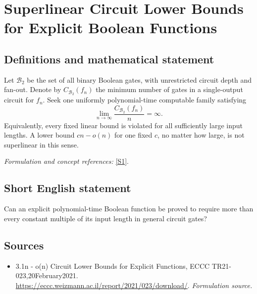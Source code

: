 \documentclass[11pt]{article}
\begin{document}
\section*{\texorpdfstring{Superlinear Circuit Lower Bounds for Explicit Boolean Functions}{Superlinear Circuit Lower Bounds for Explicit Boolean Functions}}\label{139}
\subsection{Definitions and mathematical statement}
Let $\mathcal B_2$ be the set of all binary Boolean gates, with unrestricted circuit depth and fan-out. Denote by $C_{\mathcal B_2}(f_n)$ the minimum number of gates in a single-output circuit for $f_n$. Seek one uniformly polynomial-time computable family satisfying
\[
 \lim_{n\to\infty}\frac{C_{\mathcal B_2}(f_n)}{n}=\infty.
\]
Equivalently, every fixed linear bound is violated for all sufficiently large input lengths. A lower bound $cn-o(n)$ for one fixed $c$, no matter how large, is not superlinear in this sense.
\par\smallskip\textit{Formulation and concept references:} \href{https://eccc.weizmann.ac.il/report/2021/023/download/}{[S1]}.

\subsection{Short English statement}
Can an explicit polynomial-time Boolean function be proved to require more than every constant multiple of its input length in general circuit gates?
\subsection{Sources}
\begin{itemize}
\item[S1]3.1n - o(n) Circuit Lower Bounds for Explicit Functions, ECCC TR21-023,20February2021.
\url{https://eccc.weizmann.ac.il/report/2021/023/download/}.
\textit{Formulation source.}
\end{itemize}
\end{document}
